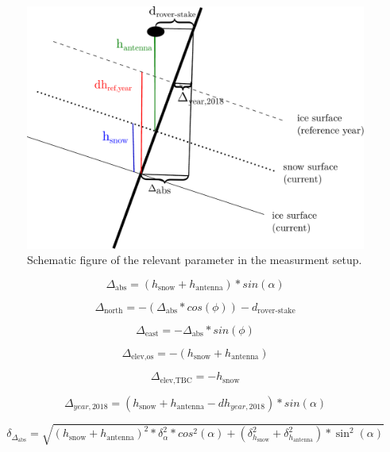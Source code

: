 \begin{figure}
\centering
\includegraphics[width=0.9\linewidth]{./figs/pictures/schematic_setup.pdf}
\caption{Schematic figure of the relevant parameter in the measurment setup.}
\end{figure}

\begin{equation}
	\Delta_{\text{abs}} = (h_{\text{snow}} + h_{\text{antenna}}) * sin(\alpha)
\end{equation}

\begin{equation}
	\Delta_{\text{north}} = - (\Delta_{\text{abs}} * cos(\phi)) - d_{\text{rover-stake}}
\end{equation}

\begin{equation}
	\Delta_{\text{east}} = - \Delta_{\text{abs}} * sin(\phi)
\end{equation}

\begin{equation}
	\Delta_{\text{elev,os}} = - (h_{\text{snow}} + h_{\text{antenna}}) 
\end{equation}

\begin{equation}
	\Delta_{\text{elev,TBC}} = - h_{\text{snow}} 
\end{equation}

\begin{equation}
	\Delta_{year,2018} = (h_{\text{snow}} + h_{\text{antenna}} - dh_{year,2018}) * sin(\alpha)
\end{equation}


\begin{equation}
	\delta_{\Delta_{\text{abs}}} = \sqrt{(h_{\text{snow}} + h_{\text{antenna}})^2 * \delta_{\alpha}^2 * cos^2(\alpha) + (\delta_{h_{\text{snow}}}^2 + \delta_{h_{\text{antenna}}}^2) * \sin^2(\alpha)}
\end{equation}

